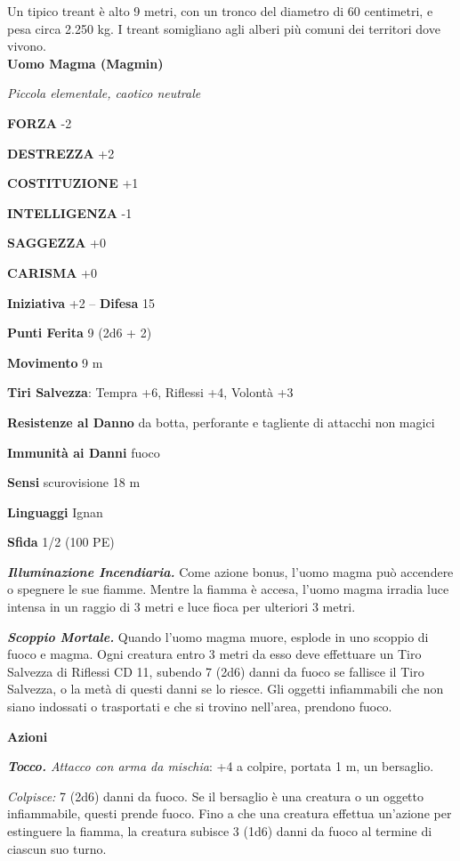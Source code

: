 \begin{multicols}{2}
Un tipico treant è alto 9 metri, con un tronco del diametro di 60 centimetri, e pesa circa 2.250 kg. I treant somigliano agli alberi più comuni dei territori dove vivono.\\



\medskip{}\textbf{Uomo Magma (Magmin)}

\emph{Piccola elementale, caotico neutrale}

\textbf{FORZA} -2

\textbf{DESTREZZA} +2

\textbf{COSTITUZIONE} +1

\textbf{INTELLIGENZA} -1

\textbf{SAGGEZZA} +0

\textbf{CARISMA} +0

\textbf{Iniziativa} +2 -- \textbf{Difesa} 15

\textbf{Punti Ferita} 9 (2d6 + 2)

\textbf{Movimento} 9 m

\textbf{Tiri Salvezza}: Tempra +6, Riflessi +4, Volontà +3

\textbf{Resistenze al Danno} da botta, perforante e tagliente di attacchi non magici

\textbf{Immunità ai Danni} fuoco

\textbf{Sensi} scurovisione 18 m

\textbf{Linguaggi} Ignan

\textbf{Sfida} 1/2 (100 PE)

\emph{\textbf{Illuminazione Incendiaria.}} Come azione bonus, l'uomo magma può accendere o spegnere le sue fiamme. Mentre la fiamma è accesa, l'uomo magma irradia luce intensa in un raggio di 3 metri e luce fioca per ulteriori 3 metri.

\emph{\textbf{Scoppio Mortale.}} Quando l'uomo magma muore, esplode in uno scoppio di fuoco e magma. Ogni creatura entro 3 metri da esso deve effettuare un Tiro Salvezza di Riflessi CD 11, subendo 7 (2d6) danni da fuoco se fallisce il Tiro Salvezza, o la metà di questi danni se lo riesce. Gli oggetti infiammabili che non siano indossati o trasportati e che si trovino nell'area, prendono fuoco.

\textbf{Azioni}

\emph{\textbf{Tocco.} Attacco con arma da mischia}: +4 a colpire, portata 1 m, un bersaglio.

\emph{Colpisce:} 7 (2d6) danni da fuoco. Se il bersaglio è una creatura o un oggetto infiammabile, questi prende fuoco. Fino a che una creatura effettua un'azione per estinguere la fiamma, la creatura subisce 3 (1d6) danni da fuoco al termine di ciascun suo turno.


\end{multicols}
